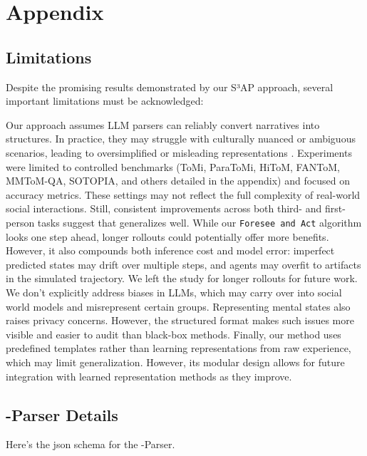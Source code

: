 \section{Appendix}

\subsection{Limitations}
\label{app:limitations}
Despite the promising results demonstrated by our S³AP approach, several important limitations must be acknowledged:

Our approach assumes LLM parsers can reliably convert narratives into \protocolname structures. In practice, they may struggle with culturally nuanced or ambiguous scenarios, leading to oversimplified or misleading representations \citep{rao2025normadframeworkmeasuringcultural}.
Experiments were limited to controlled benchmarks (ToMi, ParaToMi, HiToM, FANToM, MMToM-QA, SOTOPIA, and others detailed in the appendix) and focused on accuracy metrics. These settings may not reflect the full complexity of real-world social interactions. Still, consistent improvements across both third- and first-person tasks suggest that \protocolname generalizes well.
While our \texttt{Foresee and Act} algorithm looks one step ahead, longer rollouts could potentially offer more benefits. However, it also compounds both inference cost and model error: imperfect predicted states may drift over multiple steps, and agents may overfit to artifacts in the simulated trajectory. We left the study for longer rollouts for future work.
We don't explicitly address biases in LLMs, which may carry over into social world models and misrepresent certain groups. Representing mental states also raises privacy concerns. However, the structured format makes such issues more visible and easier to audit than black-box methods.
Finally, our method uses predefined templates rather than learning representations from raw experience, which may limit generalization. However, its modular design allows for future integration with learned representation methods as they improve.


\subsection{\protocolname-Parser Details}
\label{app:parser_details}
Here's the json schema for the \protocolname-Parser. 

